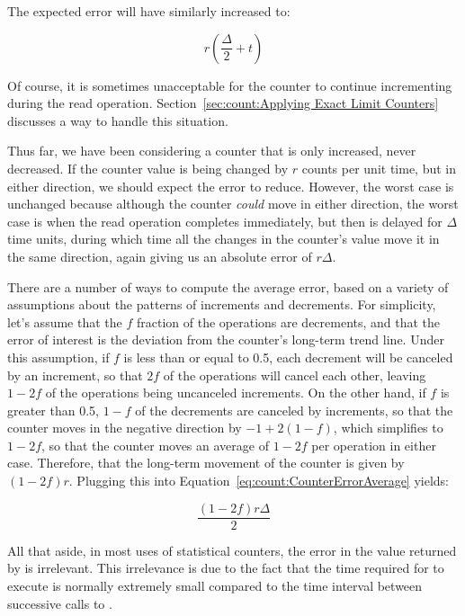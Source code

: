 {	The expected error will have similarly increased to:

	\begin{equation}
		r \left( \frac{\Delta}{2} + t \right)
	\end{equation}

	Of course, it is sometimes unacceptable for the counter to
	continue incrementing during the read operation.
	Section~\ref{sec:count:Applying Exact Limit Counters}
	discusses a way to handle this situation.

	Thus far, we have been considering a counter that is only
	increased, never decreased.
	If the counter value is being changed by $r$ counts per unit
	time, but in either direction, we should expect the error
	to reduce.
	However, the worst case is unchanged because although the
	counter \emph{could} move in either direction, the worst
	case is when the read operation completes immediately,
	but then is delayed for $\Delta$ time units, during which
	time all the changes in the counter's value move it in
	the same direction, again giving us an absolute error
	of $r \Delta$.

	There are a number of ways to compute the average error,
	based on a variety of assumptions about the patterns of
	increments and decrements.
	For simplicity, let's assume that the $f$ fraction of
	the operations are decrements, and that the error of interest
	is the deviation from the counter's long-term trend line.
	Under this assumption, if $f$ is less than or equal to 0.5,
	each decrement will be canceled by an increment, so that
	$2f$ of the operations will cancel each other, leaving
	$1-2f$ of the operations being uncanceled increments.
	On the other hand, if $f$ is greater than 0.5, $1-f$ of
	the decrements are canceled by increments, so that the
	counter moves in the negative direction by $-1+2\left(1-f\right)$,
	which simplifies to $1-2f$, so that the counter moves an average
	of $1-2f$ per operation in either case.
	Therefore, that the long-term
	movement of the counter is given by $\left( 1-2f \right) r$.
	Plugging this into
	Equation~\ref{eq:count:CounterErrorAverage} yields:

	\begin{equation}
		\frac{\left( 1 - 2 f \right) r \Delta}{2}
	\end{equation}

	All that aside, in most uses of statistical counters, the
	error in the value returned by  is
	irrelevant.
	This irrelevance is due to the fact that the time required
	for  to execute is normally extremely
	small compared to the time interval between successive
	calls to .
}\QuickQuizEnd


